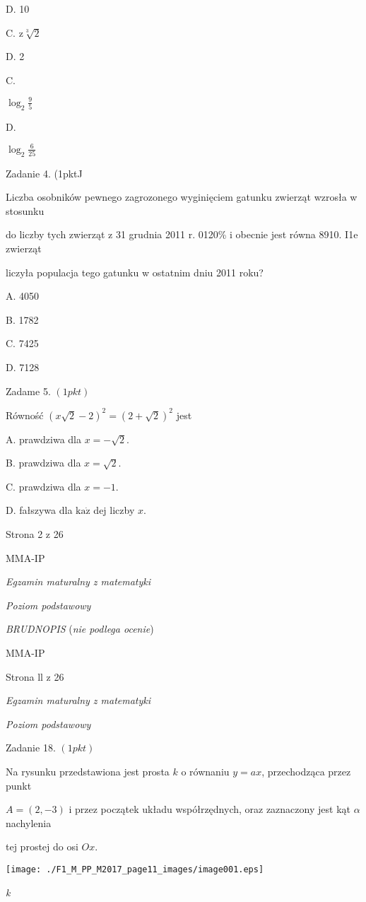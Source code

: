 \documentclass[a4paper,12pt]{article}
\begin{document}
D. 10

C. $\mathrm{z}\sqrt[3]{2}$

D. 2

C.

$\log_{2} \displaystyle \frac{9}{5}$

D.

$\displaystyle \log_{2}\frac{6}{25}$

Zadanie 4. (1pktJ

Liczba osobników pewnego zagrozonego wyginięciem gatunku zwierząt wzrosła w stosunku

do liczby tych zwierząt z 31 grudnia 2011 r. 0120\% i obecnie jest równa 8910. I1e zwierząt

liczyła populacja tego gatunku w ostatnim dniu 2011 roku?

A. 4050

B. 1782

C. 7425

D. 7128

Zadame 5. $(1pkt)$

Równość $(x\sqrt{2}-2)^{2}=(2+\sqrt{2})^{2}$ jest

A. prawdziwa dla $x=-\sqrt{2}.$

B. prawdziwa dla $x=\sqrt{2}.$

C. prawdziwa dla $x=-1.$

D. fałszywa dla $\mathrm{k}\mathrm{a}\dot{\mathrm{z}}$ dej liczby $x.$

Strona 2 z 26

MMA-IP





{\it Egzamin maturalny z matematyki}

{\it Poziom podstawowy}

{\it BRUDNOPIS} ({\it nie podlega ocenie})

MMA-IP

Strona ll z 26





{\it Egzamin maturalny z matematyki}

{\it Poziom podstawowy}

Zadanie 18. $(1pkt)$

Na rysunku przedstawiona jest prosta $k$ o równaniu $y=ax$, przechodząca przez punkt

$A=(2,-3)$ i przez początek układu współrzędnych, oraz zaznaczony jest kąt $\alpha$ nachylenia

tej prostej do osi $Ox.$
\begin{center}
\texttt{[image: ./F1\_M\_PP\_M2017\_page11\_images/image001.eps]}
\end{center}
{\it k}
\end{document}
